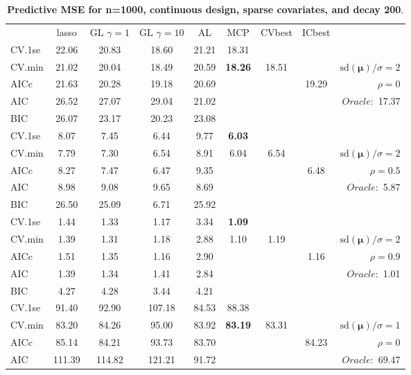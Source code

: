 \clearpage
\begin{table}\vspace{-.5cm}
\caption[l]{ { \bf Predictive MSE for n=1000, continuous design, 
sparse covariates, and  decay  200}.}
\vspace{-.5cm}
\footnotesize{}
\begin{center}
\begin{tabular}{l*{7}{c}|r}
 & lasso & GL $\gamma=1$ & GL $\gamma=10$ & AL & MCP  & CVbest & ICbest  \\
\cline{1-9}
CV.1se & 22.06 & 20.83 & 18.60 & 21.21 & 18.31 & & & \\
CV.min & 21.02 & 20.04 & 18.49 & 20.59 & {\bf 18.26} & 18.51 & & $\mathrm{sd}(\mathbf{\mu})/\sigma=2$ \\
AICc & 21.63 & 20.28 & 19.18 & 20.69 & & & 19.29 &  $\rho=0$ \\
AIC & 26.52 & 27.07 & 29.04 & 21.02 & & & &  \multirow{2}{*}{$Oracle: $ 17.37} \\
BIC & 26.07 & 23.17 & 20.23 & 23.08 & & & &  \\
 \hline 
CV.1se & 8.07 & 7.45 & 6.44 & 9.77 & {\bf 6.03} & & & \\
CV.min & 7.79 & 7.30 & 6.54 & 8.91 & 6.04 & 6.54 & & $\mathrm{sd}(\mathbf{\mu})/\sigma=2$ \\
AICc & 8.27 & 7.47 & 6.47 & 9.35 & & & 6.48 &  $\rho=0.5$ \\
AIC & 8.98 & 9.08 & 9.65 & 8.69 & & & &  \multirow{2}{*}{$Oracle: $ 5.87} \\
BIC & 26.50 & 25.09 & 6.71 & 25.92 & & & &  \\
 \hline 
CV.1se & 1.44 & 1.33 & 1.17 & 3.34 & {\bf 1.09} & & & \\
CV.min & 1.39 & 1.31 & 1.18 & 2.88 & 1.10 & 1.19 & & $\mathrm{sd}(\mathbf{\mu})/\sigma=2$ \\
AICc & 1.51 & 1.35 & 1.16 & 2.90 & & & 1.16 &  $\rho=0.9$ \\
AIC & 1.39 & 1.34 & 1.41 & 2.84 & & & &  \multirow{2}{*}{$Oracle: $ 1.01} \\
BIC & 4.27 & 4.28 & 3.44 & 4.21 & & & &  \\
 \hline 
CV.1se & 91.40 & 92.90 & 107.18 & 84.53 & 88.38 & & & \\
CV.min & 83.20 & 84.26 & 95.00 & 83.92 & {\bf 83.19} & 83.31 & & $\mathrm{sd}(\mathbf{\mu})/\sigma=1$ \\
AICc & 85.14 & 84.21 & 93.73 & 83.70 & & & 84.23 &  $\rho=0$ \\
AIC & 111.39 & 114.82 & 121.21 & 91.72 & & & &  \multirow{2}{*}{$Oracle: $ 69.47} \\

\end{tabular}
\end{center}
\end{table}
